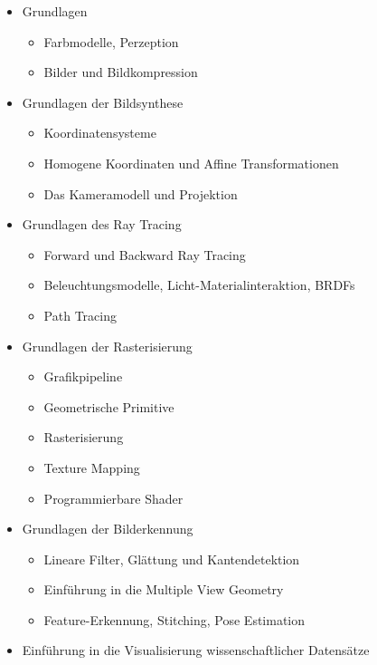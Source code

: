 \begin{itemize}
\tightlist
\item
  Grundlagen

  \begin{itemize}
\tightlist
\item
    Farbmodelle, Perzeption
  \item
    Bilder und Bildkompression
  \end{itemize}
\item
  Grundlagen der Bildsynthese

  \begin{itemize}
\tightlist
\item
    Koordinatensysteme
  \item
    Homogene Koordinaten und Affine Transformationen
  \item
    Das Kameramodell und Projektion
  \end{itemize}
\item
  Grundlagen des Ray Tracing

  \begin{itemize}
\tightlist
\item
    Forward und Backward Ray Tracing
  \item
    Beleuchtungsmodelle, Licht-Materialinteraktion, BRDFs
  \item
    Path Tracing
  \end{itemize}
\item
  Grundlagen der Rasterisierung

  \begin{itemize}
\tightlist
\item
    Grafikpipeline
  \item
    Geometrische Primitive
  \item
    Rasterisierung
  \item
    Texture Mapping
  \item
    Programmierbare Shader
  \end{itemize}
\item
  Grundlagen der Bilderkennung

  \begin{itemize}
\tightlist
\item
    Lineare Filter, Glättung und Kantendetektion
  \item
    Einführung in die Multiple View Geometry
  \item
    Feature-Erkennung, Stitching, Pose Estimation
  \end{itemize}
\item
  Einführung in die Visualisierung wissenschaftlicher Datensätze


\end{itemize}
